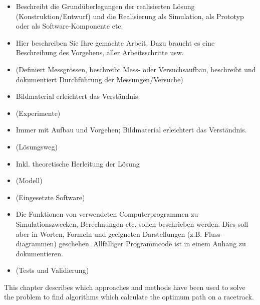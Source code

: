 \begin{itemize}
    \item Beschreibt die Grundüberlegungen der realisierten Lösung (Konstruktion/Entwurf) und die Realisierung als Simulation, als Prototyp oder als Software-Komponente etc.
    \item Hier beschreiben Sie Ihre gemachte Arbeit. Dazu braucht es eine Beschreibung des Vorgehens, aller Arbeitsschritte usw.
    \item (Definiert Messgrössen, beschreibt Mess- oder Versuchsaufbau, beschreibt und dokumentiert Durchführung der Messungen/Versuche)
    \item Bildmaterial erleichtert das Verständnis.
    \item (Experimente)
    \item Immer mit Aufbau und Vorgehen; Bildmaterial erleichtert das Verständnis.
    \item (Lösungsweg)
    \item Inkl. theoretische Herleitung der Lösung
    \item (Modell)
    \item (Eingesetzte Software)
    \item Die Funktionen von verwendeten Computerprogrammen zu Simulationszwecken, Berechnungen etc. sollen beschrieben werden. Dies soll aber in Worten, Formeln und geeigneten Darstellungen (z.B. Fluss- diagrammen) geschehen. Allfälliger Programmcode ist in einem Anhang zu dokumentieren.
    \item (Tests und Validierung)
\end{itemize}

This chapter describes which approaches and methods have been used to solve the problem to find algorithms which calculate the optimum path on a racetrack.

